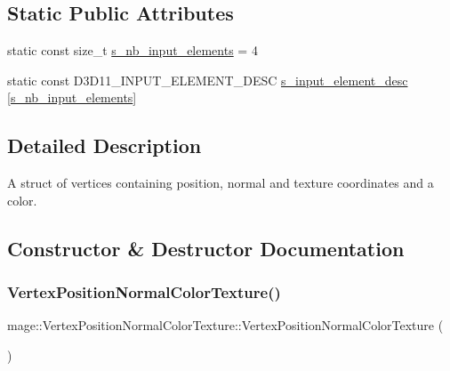 \subsection*{Static Public Attributes}
\begin{DoxyCompactItemize}
\item 
static const size\+\_\+t \hyperlink{structmage_1_1_vertex_position_normal_color_texture_acd54df21f1baf73279d24dbc7037eeff}{s\+\_\+nb\+\_\+input\+\_\+elements} = 4
\item 
static const D3\+D11\+\_\+\+I\+N\+P\+U\+T\+\_\+\+E\+L\+E\+M\+E\+N\+T\+\_\+\+D\+E\+SC \hyperlink{structmage_1_1_vertex_position_normal_color_texture_a95286a5de390f414f036371f4ad08de1}{s\+\_\+input\+\_\+element\+\_\+desc} \mbox{[}\hyperlink{structmage_1_1_vertex_position_normal_color_texture_acd54df21f1baf73279d24dbc7037eeff}{s\+\_\+nb\+\_\+input\+\_\+elements}\mbox{]}
\end{DoxyCompactItemize}


\subsection{Detailed Description}
A struct of vertices containing position, normal and texture coordinates and a color. 

\subsection{Constructor \& Destructor Documentation}
\hypertarget{structmage_1_1_vertex_position_normal_color_texture_ae90b4ebe4ebe0fb3ddec941dca6a2dc1}{}\label{structmage_1_1_vertex_position_normal_color_texture_ae90b4ebe4ebe0fb3ddec941dca6a2dc1} 
\subsubsection{\texorpdfstring{Vertex\+Position\+Normal\+Color\+Texture()}{VertexPositionNormalColorTexture()}\hspace{0.1cm}{\footnotesize\ttfamily [1/4]}}
{\footnotesize\ttfamily mage\+::\+Vertex\+Position\+Normal\+Color\+Texture\+::\+Vertex\+Position\+Normal\+Color\+Texture (\begin{DoxyParamCaption}{ }\end{DoxyParamCaption})\hspace{0.3cm}{\ttfamily [default]}}

